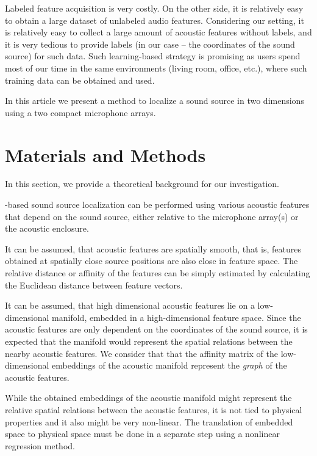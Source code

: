 \documentclass[applsci,article,submit,moreauthors,pdftex]{Definitions/mdpi}
\begin{document}
Labeled feature acquisition is very costly.
On the other side, it is relatively easy to obtain a large dataset of unlabeled audio features. 
Considering our setting, it is relatively easy to collect a large amount of acoustic features without labels, and it is very tedious to provide labels (in our case -- the coordinates of the sound source) for such data. Such learning-based strategy is promising as users spend most of our time in the same environments (living room, office, etc.), where such training data can be obtained and used.


In this article we present a method to localize a sound source in two dimensions using a two compact microphone arrays. 

\section{Materials and Methods}

In this section, we provide a theoretical background for our investigation.

\ann{}-based sound source localization can be performed using various acoustic features that depend on the sound source, either relative to the microphone array(s) or the acoustic enclosure.

It can be assumed, that acoustic features are spatially smooth, that is, features obtained at spatially close source positions are also close in feature space. The relative distance or affinity of the features can be simply estimated by calculating the Euclidean distance between feature vectors. 

It can be assumed, that high dimensional acoustic features lie on a low-dimensional manifold, embedded in a high-dimensional feature space. 
Since the acoustic features are only dependent on the coordinates of the sound source, it is expected that the manifold would represent the spatial relations between the nearby acoustic features. 
We consider that that the affinity matrix of the low-dimensional embeddings of the acoustic manifold represent the \emph{graph} of the acoustic features.

While the obtained embeddings of the acoustic manifold might represent the relative spatial relations between the acoustic features, it is not tied to physical properties and it also might be very non-linear. The translation of embedded space to physical space must be done in a separate step using a nonlinear regression method. 
\end{document}
